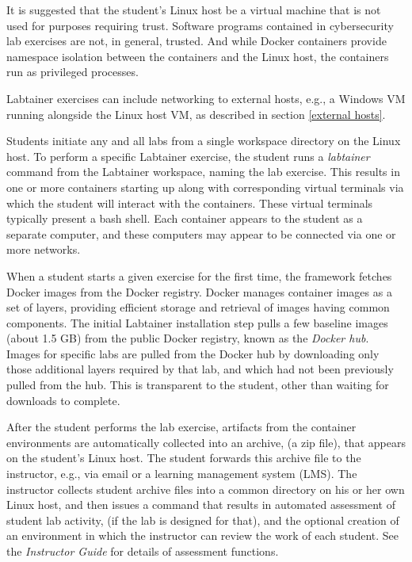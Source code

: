 \documentclass[12pt]{article}
\begin{document}
It is suggested that the student's Linux host be a virtual machine that is
not used for purposes requiring trust.  Software programs contained in cybersecurity lab
exercises are not, in general, trusted.  And while Docker containers provide namespace
isolation between the containers and the Linux host, the containers run as privileged processes.

Labtainer exercises can include networking to external hosts, e.g., a Windows VM
running alongside the Linux host VM, as described in section \ref{external hosts}.

Students initiate any and all labs from a
single workspace directory on the Linux host.
To perform a specific Labtainer exercise, the student runs a \textit{labtainer} command from
the Labtainer workspace, naming the lab exercise.  This results in one or more
containers starting up along with corresponding virtual terminals via which the 
student will interact with the containers.  These virtual terminals typically
present a bash shell.  Each container appears to the student as a separate
computer, and these computers may appear to be connected via one or more networks.  

When a student starts a given exercise for the first time, the framework fetches
Docker images from the Docker registry.  Docker manages container images as a set of
layers, providing efficient storage and retrieval of images having common components.
The initial Labtainer installation step pulls a few baseline images (about 1.5 GB) from 
the public
Docker registry, known as the \textit{Docker hub}.  Images for specific labs are pulled
from the Docker hub by downloading only those additional layers required by that lab, and
which had not been previously pulled from the hub.  This is transparent to
the student, other than waiting for downloads to complete.

After the student performs the lab exercise, artifacts from the container
environments are automatically collected into an archive, (a zip file), that appears on
the student's Linux host.  The student forwards this archive file to the instructor,
e.g., via email or a learning management system (LMS).  The instructor collects student archive files into a common
directory on his or her own Linux host, and then issues a command that
results in automated assessment of student lab
activity, (if the lab is designed for that), and the optional creation of an environment
in which the instructor can review the work of each student.  See the \textit{Instructor Guide} for details
of assessment functions.
\end{document}
